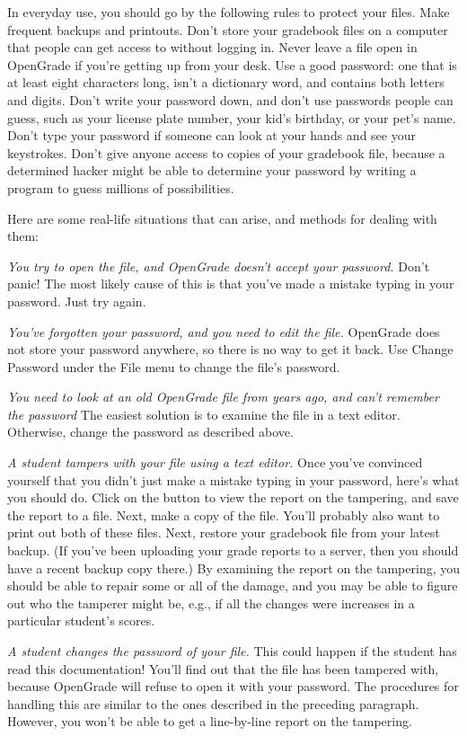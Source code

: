 \documentclass{opengrade_doc}
\begin{document}
In everyday use, you should go by the following rules to protect your
files. Make frequent
backups and printouts. Don't store your gradebook files on a computer
that people can get access to without logging in. Never leave a file
open in OpenGrade if you're getting up from your desk. 
Use a good password: one that is at least eight characters long,
isn't a dictionary word, and contains both letters and digits.
Don't write your password down, and don't use passwords people can
guess, such as your license plate number, your kid's birthday, or
your pet's name. Don't type your password if someone can look at
your hands and see your keystrokes. Don't give anyone access to copies of your
gradebook file, because a determined hacker might be able to determine your
password by writing a program to guess millions of possibilities.

Here are some
real-life situations that can arise, and methods for dealing with
them:

\emph{You try to open the file, and OpenGrade doesn't accept your password.\/}
Don't panic! The most likely cause of this is that you've made a mistake
typing in your password. Just try again.

\emph{You've forgotten your password, and you need to edit the file.\/}
OpenGrade does not store your password anywhere, so there is no
way to get it back.
Use Change Password under the File menu to change the file's password.

\emph{You need to look at an old OpenGrade file from years
ago, and can't remember the password}
The easiest solution is to examine the file in a text editor. Otherwise,
change the password as described above.

\emph{A student tampers with your file using a text editor.\/}
Once you've convinced yourself that you didn't just make a mistake typing
in your password, here's what you should do. Click on the button to view
the report on the tampering, and save the report to a file.
Next, make a copy of
the file. You'll probably also want to print out both of these files.
Next, restore your gradebook file from your latest backup. (If you've been uploading
your grade reports to a server, then you should have a recent backup copy
there.) By examining the report on the tampering, you should be able to
repair some or all of the damage, and you may be able to figure out who
the tamperer might be, e.g., if all the changes were increases in a
particular student's scores.

\emph{A student changes the password of your file.\/}
This could happen if the student has read this documentation! You'll find
out that the file has been tampered with, because OpenGrade will refuse to
open it with your password. The procedures for handling this are
similar to the ones described in the preceding paragraph. However, you won't
be able to get a line-by-line report on the tampering.
\end{document}
